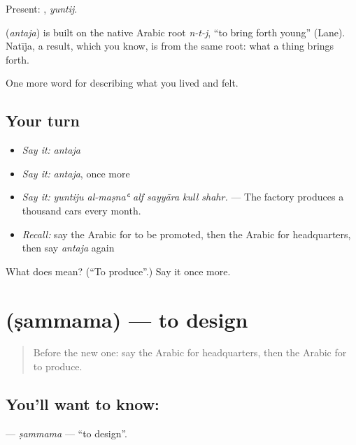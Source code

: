 Present: , \emph{yuntij}.

\begin{cousinweb}
\textbf{} (\emph{antaja}) is built on the native Arabic root \emph{n-t-j}, \textquotedblleft{}to bring forth young\textquotedblright{} (Lane). Natīja, a result, which you know, is from the same root: what a thing brings forth.
\end{cousinweb}

\begin{grammarlens}[title={What you've built}]
One more word for describing what you lived and felt.
\end{grammarlens}

\subsection*{Your turn}
\begin{itemize}
\raggedright
  \item \emph{Say it:} \emph{antaja}
  \item \emph{Say it:} \emph{antaja}, once more
  \item \emph{Say it:} \emph{yuntiju al-maṣnaʿ alf sayyāra kull shahr.} — The factory produces a thousand cars every month.
  \item \emph{Recall:} say the Arabic for to be promoted, then the Arabic for headquarters, then say \emph{antaja} again
\end{itemize}

\begin{tcolorbox}[breakable,colback=teal!4,colframe=teal!35!black,title={Before you move on}]
What does  mean? (\textquotedblleft{}To produce\textquotedblright{}.) Say it once more.
\end{tcolorbox}
\section[\texorpdfstring{\ar{صمم} (ṣammama)}{صمم (ṣammama)}]{ (ṣammama) — to design}

\label{lesson:AR-C525-sammama}



\begin{quote}
Before the new one: say the Arabic for headquarters, then the Arabic for to produce.
\end{quote}

\subsection*{You'll want to know: }
\textbf{} — \emph{ṣammama} — \textquotedblleft{}to design\textquotedblright{}.

